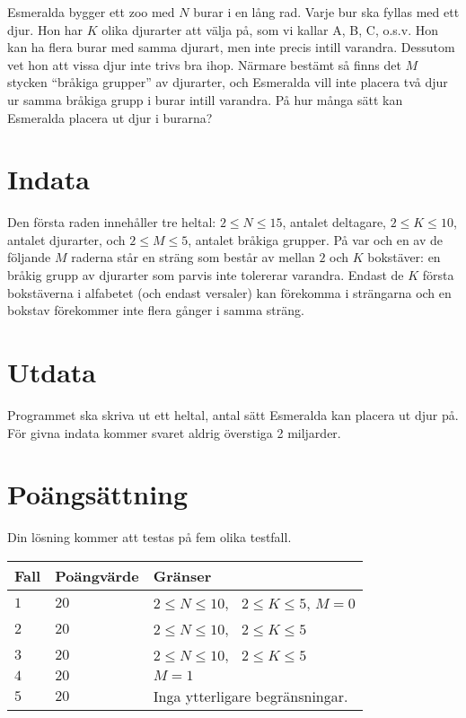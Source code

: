 
Esmeralda bygger ett zoo med $N$ burar i en lång rad. Varje bur ska fyllas med ett djur. Hon har $K$ olika djurarter att välja på, som vi kallar A, B, C, o.s.v. Hon kan ha flera burar med samma djurart, men inte precis intill varandra. Dessutom vet hon att vissa djur inte trivs bra ihop. Närmare bestämt så finns det $M$ stycken ``bråkiga grupper'' av djurarter, och Esmeralda vill inte placera två djur ur samma bråkiga grupp i burar intill varandra. På hur många sätt kan Esmeralda placera ut djur i burarna?

\section*{Indata}
Den första raden innehåller tre heltal: $2\le N \le 15$, antalet deltagare, $2\le K \le 10$, antalet djurarter, och $2 \le M\le 5$, antalet bråkiga grupper. På var och en av de följande $M$ raderna står en sträng som består av mellan $2$ och $K$ bokstäver: en bråkig grupp av djurarter som parvis inte tolererar varandra. Endast de $K$ första bokstäverna i alfabetet (och endast versaler) kan förekomma i strängarna och en bokstav förekommer inte flera gånger i samma sträng.

\section*{Utdata}
Programmet ska skriva ut ett heltal, antal sätt Esmeralda kan placera ut djur på. För givna indata kommer svaret aldrig överstiga 2 miljarder.

\section*{Poängsättning}
Din lösning kommer att testas på fem olika testfall.

\noindent
\begin{tabular}{| l | l | l |}
  \hline
  Fall & Poängvärde & Gränser \\ \hline
  $1$    & $20$        &  $2\le N \le 10$, $\;\;2\le K \le 5$, $M=0$\\ \hline 
  $2$    & $20$        &  $2\le N \le 10$, $\;\;2\le K \le 5$ \\ \hline
  $3$    & $20$        &  $2\le N \le 10$, $\;\;2\le K \le 5$ \\ \hline
  $4$    & $20$        &  $M=1$ \\ \hline
  $5$    & $20$        &  Inga ytterligare begränsningar. \\ \hline
\end{tabular}

